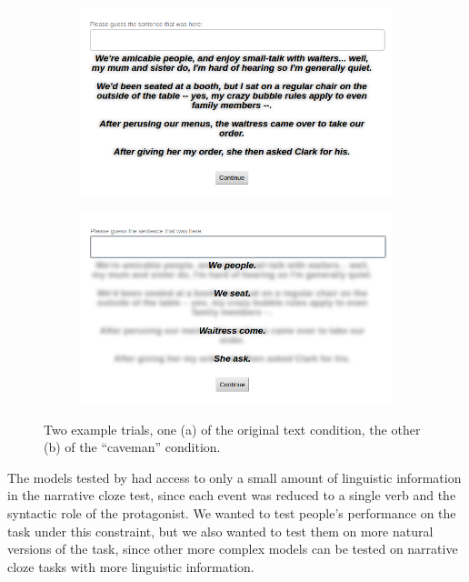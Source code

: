 \documentclass[10pt,a4paper]{article}
\begin{document}
\begin{figure}
 \centering
 \begin{subfigure}{0.4\paperwidth}
  \centering
  \includegraphics[width=0.35\paperwidth]{images/trial-full-text.png}
  \caption{}
  \label{fig:trial-full-text}
 \end{subfigure}
 \begin{subfigure}{0.4\paperwidth}
  \centering
  \includegraphics[width=0.35\paperwidth]{images/trial-caveman.png}
  \caption{}
  \label{fig:trial-caveman}
 \end{subfigure}
 \caption{Two example trials, one (a) of the original text condition, the other (b) of the ``caveman'' condition.}
 \label{fig:trial}
\end{figure}


The models tested by  had access to only a small amount of linguistic information in the narrative cloze test, since each event was reduced to a single verb and the syntactic role of the protagonist.
We wanted to test people's performance on the task under this constraint, but we also wanted to test them on more natural versions of the task, since other more complex models can be tested on narrative cloze tasks with more linguistic information.
\end{document}
